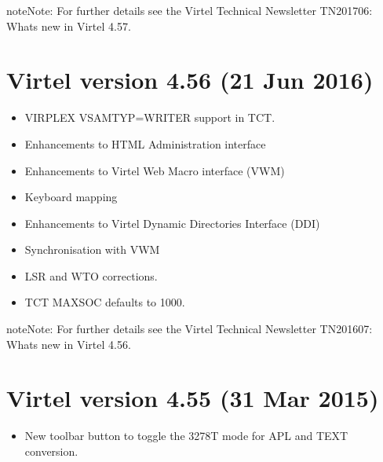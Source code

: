 \documentclass[letterpaper,10pt,english]{sphinxmanual}
\begin{document}
\begin{sphinxadmonition}{note}{Note:}
For further details see the Virtel Technical Newsletter TN201706: Whats new in Virtel 4.57.
\end{sphinxadmonition}


\section{Virtel version 4.56 (21 Jun 2016)}
\label{\detokenize{Installation_Guide:virtel-version-4-56-21-jun-2016}}
\begin{itemize}
\item {} 
VIRPLEX VSAMTYP=WRITER support in TCT.

\item {} 
Enhancements to HTML Administration interface

\item {} 
Enhancements to Virtel Web Macro interface (VWM)

\item {} 
Keyboard mapping

\item {} 
Enhancements to Virtel Dynamic Directories Interface (DDI)

\item {} 
Synchronisation with VWM

\end{itemize}

\begin{itemize}
\item {} 
LSR and WTO corrections.

\item {} 
TCT MAXSOC defaults to 1000.

\end{itemize}

\begin{sphinxadmonition}{note}{Note:}
For further details see the Virtel Technical Newsletter TN201607: Whats new in Virtel 4.56.
\end{sphinxadmonition}


\section{Virtel version 4.55 (31 Mar 2015)}
\label{\detokenize{Installation_Guide:virtel-version-4-55-31-mar-2015}}
\begin{itemize}
\item {} 
New toolbar button to toggle the 3278T mode for APL and TEXT conversion.

\end{itemize}
\end{document}
